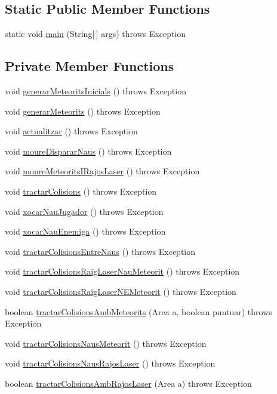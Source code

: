 \subsection*{Static Public Member Functions}
\begin{DoxyCompactItemize}
\item 
static void \hyperlink{class_joc_a54cbe41c97ce7489f7b0cc62217a7d29}{main} (String\mbox{[}$\,$\mbox{]} args)  throws Exception 
\end{DoxyCompactItemize}
\subsection*{Private Member Functions}
\begin{DoxyCompactItemize}
\item 
void \hyperlink{class_joc_ab4169a454c9b3b6b6030fd785483a15d}{generar\+Meteorits\+Inicials} ()  throws Exception 
\item 
void \hyperlink{class_joc_afb711913c78395c05839c3f775792beb}{generar\+Meteorits} ()  throws Exception 
\item 
void \hyperlink{class_joc_aafe85787281ae19be9ee44aabc5c116c}{actualitzar} ()  throws Exception 
\item 
void \hyperlink{class_joc_a5e56bca64b024955afe5269cbc79ca79}{moure\+Disparar\+Naus} ()  throws Exception 
\item 
void \hyperlink{class_joc_af9e0ddcc5b82db8ff4d07bbd443c7f8d}{moure\+Meteorits\+I\+Rajos\+Laser} ()  throws Exception 
\item 
void \hyperlink{class_joc_a1be330c10f1e2ee06f696e0a0bdec7c7}{tractar\+Colisions} ()  throws Exception 
\item 
void \hyperlink{class_joc_a471c58ad94b7a8732a6b3e4695f2a691}{xocar\+Nau\+Jugador} ()  throws Exception 
\item 
void \hyperlink{class_joc_a84da80994a7dd370b3772cf962500617}{xocar\+Nau\+Enemiga} ()  throws Exception 
\item 
void \hyperlink{class_joc_abc5db47ede50ddeccb50b2872d05cb6c}{tractar\+Colisions\+Entre\+Naus} ()  throws Exception 
\item 
void \hyperlink{class_joc_a9a3116242cc69985726f4825be70a9b5}{tractar\+Colisions\+Raig\+Laser\+Nau\+Meteorit} ()  throws Exception 
\item 
void \hyperlink{class_joc_af717aa44d1134343a67fc08374c3af45}{tractar\+Colisions\+Raig\+Laser\+N\+E\+Meteorit} ()  throws Exception 
\item 
boolean \hyperlink{class_joc_a16b0be1ee6298106946df8150044f667}{tractar\+Colisions\+Amb\+Meteorits} (Area a, boolean puntuar)  throws Exception 
\item 
void \hyperlink{class_joc_acf31c665e8f734f15f40f8e6792e8bba}{tractar\+Colisions\+Naus\+Meteorit} ()  throws Exception 
\item 
void \hyperlink{class_joc_a9ccc5adec1e7efdd6c01ba393d3686c6}{tractar\+Colisions\+Naus\+Rajos\+Laser} ()  throws Exception 
\item 
boolean \hyperlink{class_joc_ac94f4a327797f506171f0db74b3feaee}{tractar\+Colisions\+Amb\+Rajos\+Laser} (Area a)  throws Exception 
\end{DoxyCompactItemize}


